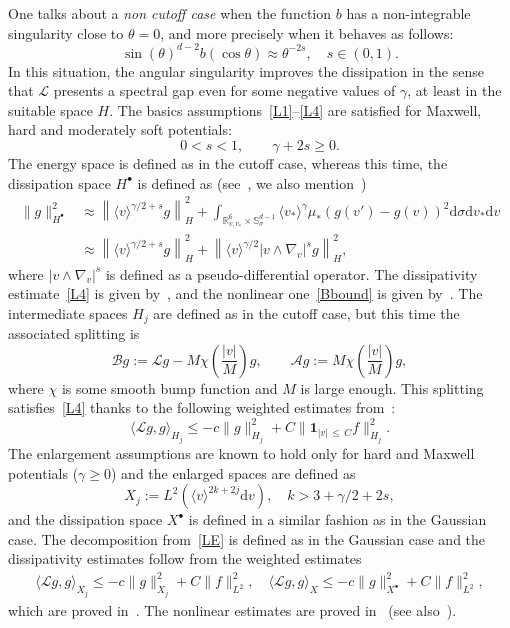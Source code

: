 \documentclass[AHL,Unicode,longabstracts,published]{cedram}
\renewcommand{\d}{\mathrm{d}}
\newcommand{\Burin}{\mathbf{1}}
\newcommand{\R}{\mathbb{R}}
\renewcommand{\S}{\mathbb{S}}
\renewcommand{\AA}{\mathcal{A}}
\newcommand{\BB}{\mathcal{B}}
\newcommand{\LL}{\mathcal{L}}
\newcommand{\Ss}{H}
\newcommand{\Ssp}{H^{\bullet}}
\newcommand{\Sl}{X}
\newcommand{\Slp}{X^{\bullet}}
\renewcommand*\le{\leqslant}
\renewcommand*\ge{\geqslant}
\newcommand{\la}{\langle}
\newcommand{\ra}{\rangle}
\begin{document}
One talks about a \emph{non cutoff case} when the function $b$ has a non-integrable singularity close to $\theta = 0$, and more precisely when it behaves as follows:
\[
\sin (\theta)^{d-2} b(\cos \theta) \approx \theta^{-2 s}, \quad s \in (0, 1).
\]
In this situation, the angular singularity improves the dissipation in the sense that $\LL$ presents a spectral gap even for some negative values of $\gamma$, at least in the suitable space $\Ss$. The basics assumptions~\eqref{L1}--\eqref{L4} are satisfied for Maxwell, hard and moderately soft potentials:
\[
0 < s < 1, \qquad \gamma + 2 s \ge 0.
\]
The energy space is defined as in the cutoff case, whereas this time, the dissipation space $\Ssp$ is defined as (see~\cite{AHL2019,AMUXY2011}, we also mention~\cite{GS2011})
\begin{align*}
\| g \|^2_{\Ssp} & \approx \left\| \la v \ra^{\gamma/2 + s} g \right\|_{\Ss}^2 + \int_{\R^6_{v, v_*} \times \S^{d-1}_\sigma } \la v_* \ra^{\gamma} \mu_* \left(g(v') - g(v) \right)^2 \d \sigma \d v_* \d v \\
& \approx \left\| \la v \ra^{\gamma/2 + s} g \right\|_{\Ss}^2 + \left\| \la v \ra^{\gamma/2} | v \land \nabla_v |^s g \right\|^2_{\Ss},
\end{align*}
where $| v \land \nabla_v |^s$ is defined as a pseudo-differential operator. The dissipativity estimate~\ref{L4} is given by~\cite[Lemma~2.6]{AMUXY2011}, and the nonlinear one~\eqref{Bbound} is given by~\cite[Theorem~2.1]{GS2011}. The intermediate spaces $\Ss_j$ are defined as in the cutoff case, but this time the associated splitting is
\[
\BB g := \LL g- M \chi\left(\frac{|v|}{M} \right) g, \qquad \AA g := M \chi\left(\frac{|v|}{M} \right) g,
\]
where $\chi$ is some smooth bump function and $M$ is large enough. This splitting satisfies~\eqref{L4} thanks to the following weighted estimates from~\cite[Lemmas~2.4-2.5]{GS2011}:
\[
\la \LL g, g \ra_{\Ss_j} \le - c \| g \|^2_{\Ss_j} + C \| \Burin_{|v|\,\le\,C} f \|_{\Ss_j}^2.
\]
The enlargement assumptions are known to hold only for hard and Maxwell potentials ($\gamma \ge 0$) and the enlarged spaces are defined as
\[
\Sl_j := L^2\left(\la v \ra^{2k+2j} \d v \right), \quad k > 3 + \gamma/2 + 2 s,
\]
and the dissipation space $\Slp$ is defined in a similar fashion as in the Gaussian case. The decomposition from~\eqref{LE} is defined as in the Gaussian case and the dissipativity estimates follow from the weighted estimates
\begin{gather*}
\la \LL g, g \ra_{\Sl_j} \le - c \| g \|^2_{\Sl_j} + C \| f \|_{L^2}^2,
\quad \la \LL g, g \ra_{\Sl} \le - c \| g \|^2_{\Slp} + C \| f \|_{L^2}^2,
\end{gather*}
which are proved in~\cite[Lemma~4.2]{HTT2020}. The nonlinear estimates are proved in~\cite[Lemma~2.12]{CDL2022} (see also~\cite{AMSY2021,HTT2020}).
\end{document}
